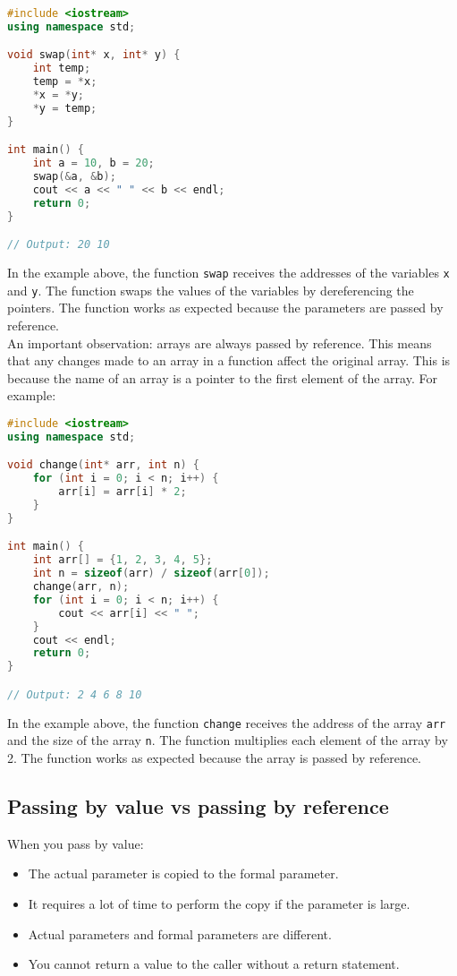 \begin{lstlisting}[language=C++]
#include <iostream>
using namespace std;

void swap(int* x, int* y) {
    int temp;
    temp = *x;
    *x = *y;
    *y = temp;
}

int main() {
    int a = 10, b = 20;
    swap(&a, &b);
    cout << a << " " << b << endl;
    return 0;
}

// Output: 20 10
\end{lstlisting}

In the example above, the function \texttt{swap} receives the addresses of the
variables \texttt{x} and \texttt{y}. The function swaps the values of the
variables by dereferencing the pointers. The function works as expected because
the parameters are passed by reference.\\

An important observation: arrays are always passed by reference. This means that
any changes made to an array in a function affect the original array. This is 
because the name of an array is a pointer to the first element of the array. For
example:\\

\begin{lstlisting}[language=C++]
#include <iostream>
using namespace std;

void change(int* arr, int n) {
    for (int i = 0; i < n; i++) {
        arr[i] = arr[i] * 2;
    }
}

int main() {
    int arr[] = {1, 2, 3, 4, 5};
    int n = sizeof(arr) / sizeof(arr[0]);
    change(arr, n);
    for (int i = 0; i < n; i++) {
        cout << arr[i] << " ";
    }
    cout << endl;
    return 0;
}

// Output: 2 4 6 8 10
\end{lstlisting}

In the example above, the function \texttt{change} receives the address of the
array \texttt{arr} and the size of the array \texttt{n}. The function multiplies
each element of the array by 2. The function works as expected because the array
is passed by reference.\\

\subsection{Passing by value vs passing by reference}

When you pass by value:

\begin{itemize}
    \item The actual parameter is copied to the formal parameter.
    \item It requires a lot of time to perform the copy if the parameter is large.
    \item Actual parameters and formal parameters are different.
    \item You cannot return a value to the caller without a return statement.
\end{itemize}

